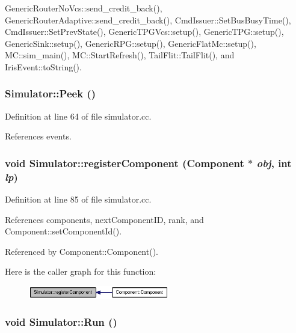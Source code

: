 GenericRouterNoVcs::send\_\-credit\_\-back(), GenericRouterAdaptive::send\_\-credit\_\-back(), CmdIssuer::SetBusBusyTime(), CmdIssuer::SetPrevState(), GenericTPGVcs::setup(), GenericTPG::setup(), GenericSink::setup(), GenericRPG::setup(), GenericFlatMc::setup(), MC::sim\_\-main(), MC::StartRefresh(), TailFlit::TailFlit(), and IrisEvent::toString().
\subsubsection[{Peek}]{ Simulator::Peek ()\hspace{0.3cm}{\tt  [static]}}\label{classSimulator_b70ac4a1b36c3a20e7548203d22b9c17}




Definition at line 64 of file simulator.cc.

References events.
\subsubsection[{registerComponent}]{\setlength{\rightskip}{0pt plus 5cm}void Simulator::registerComponent ({\bf Component} $\ast$ {\em obj}, \/  int {\em lp})\hspace{0.3cm}{\tt  [static]}}\label{classSimulator_bc27a87849e9903771b3990c99c750bd}




Definition at line 85 of file simulator.cc.

References components, nextComponentID, rank, and Component::setComponentId().

Referenced by Component::Component().

Here is the caller graph for this function:\nopagebreak
\begin{figure}[H]
\begin{center}
\leavevmode
\includegraphics[width=174pt]{classSimulator_bc27a87849e9903771b3990c99c750bd_icgraph}
\end{center}
\end{figure}
\subsubsection[{Run}]{\setlength{\rightskip}{0pt plus 5cm}void Simulator::Run ()\hspace{0.3cm}{\tt  [static]}}\label{classSimulator_27e7045e7aa4e29e9d2003aaa09c8326}




